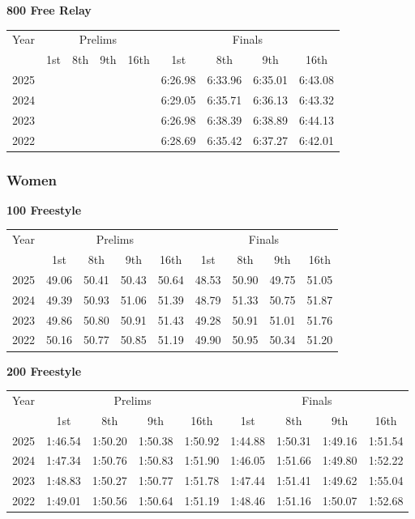 \textbf{800 Free Relay}

\begin{flushleft}
\begin{tabular}{|c|c|c|c|c|c|c|c|c|}
\hline
Year & \multicolumn{4}{c|}{Prelims} & \multicolumn{4}{c|}{Finals} \\
\cline{2-9}
& 1st & 8th & 9th & 16th & 1st & 8th & 9th & 16th \\
\hline
2025 &  &  &  &  & 6:26.98 & 6:33.96 & 6:35.01 & 6:43.08 \\
2024 &  &  &  &  & 6:29.05 & 6:35.71 & 6:36.13 & 6:43.32 \\
2023 &  &  &  &  & 6:26.98 & 6:38.39 & 6:38.89 & 6:44.13 \\
2022 &  &  &  &  & 6:28.69 & 6:35.42 & 6:37.27 & 6:42.01 \\
\hline
\end{tabular}
\end{flushleft}

\subsubsection{Women}

\textbf{100 Freestyle}

\begin{flushleft}
\begin{tabular}{|c|c|c|c|c|c|c|c|c|}
\hline
Year & \multicolumn{4}{c|}{Prelims} & \multicolumn{4}{c|}{Finals} \\
\cline{2-9}
& 1st & 8th & 9th & 16th & 1st & 8th & 9th & 16th \\
\hline
2025 & 49.06 & 50.41 & 50.43 & 50.64 & 48.53 & 50.90 & 49.75 & 51.05 \\
2024 & 49.39 & 50.93 & 51.06 & 51.39 & 48.79 & 51.33 & 50.75 & 51.87 \\
2023 & 49.86 & 50.80 & 50.91 & 51.43 & 49.28 & 50.91 & 51.01 & 51.76 \\
2022 & 50.16 & 50.77 & 50.85 & 51.19 & 49.90 & 50.95 & 50.34 & 51.20 \\
\hline
\end{tabular}
\end{flushleft}

\textbf{200 Freestyle}

\begin{flushleft}
\begin{tabular}{|c|c|c|c|c|c|c|c|c|}
\hline
Year & \multicolumn{4}{c|}{Prelims} & \multicolumn{4}{c|}{Finals} \\
\cline{2-9}
& 1st & 8th & 9th & 16th & 1st & 8th & 9th & 16th \\
\hline
2025 & 1:46.54 & 1:50.20 & 1:50.38 & 1:50.92 & 1:44.88 & 1:50.31 & 1:49.16 & 1:51.54 \\
2024 & 1:47.34 & 1:50.76 & 1:50.83 & 1:51.90 & 1:46.05 & 1:51.66 & 1:49.80 & 1:52.22 \\
2023 & 1:48.83 & 1:50.27 & 1:50.77 & 1:51.78 & 1:47.44 & 1:51.41 & 1:49.62 & 1:55.04 \\
2022 & 1:49.01 & 1:50.56 & 1:50.64 & 1:51.19 & 1:48.46 & 1:51.16 & 1:50.07 & 1:52.68 \\
\hline
\end{tabular}
\end{flushleft}

